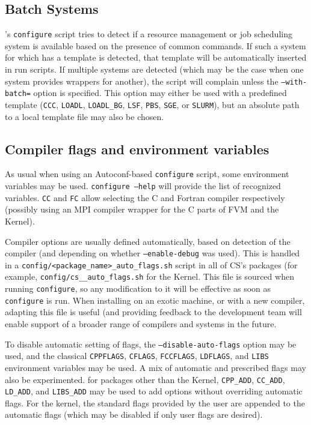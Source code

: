 \documentclass[a4paper,10pt,twoside]{article}
\begin{document}
\subsection{Batch Systems\label{sec:config:batch}}

\CS's {\tt configure} script tries to detect if a resource management or
job scheduling system is available based on the presence of common commands.
If such a system for which \CS has a template is detected,
that template will be automatically inserted in run scripts.
If multiple systems are detected (which may be the case when one system provides
wrappers for another), the script will complain unless the \texttt{--with-batch=}
option is specified. This option may either be used with a predefined template
(\texttt{CCC}, \texttt{LOADL}, \texttt{LOADL\_BG}, \texttt{LSF}, \texttt{PBS},
\texttt{SGE}, or \texttt{SLURM}), but an absolute path to a local template
file may also be chosen.

\subsection{Compiler flags and environment variables\label{sec:config:flags}}

As usual when using an Autoconf-based \texttt{configure} script,
some environment variables may be used. \texttt{configure --help}
will provide the list of recognized variables.
\texttt{CC} and \texttt{FC} allow selecting the C and Fortran compiler
respectively (possibly using an MPI compiler wrapper for the C parts
of FVM and the Kernel).

Compiler options are usually defined automatically, based on
detection of the compiler (and depending on whether \texttt{--enable-debug}
was used). This is handled in a \texttt{config/<package\_name>\_auto\_flags.sh}
script in all of CS's packages (for example,
\texttt{config/cs\_\_auto\_flags.sh}
for the Kernel. This file is sourced when running \texttt{configure}, so
any modification to it will be effective as soon as \texttt{configure} is run.
When installing on an exotic machine, or with a new compiler, adapting this
file is useful (and providing feedback to the \CS development team
will enable support of a broader range of compilers and systems in the
future.

To disable automatic setting of flags, the \texttt{--disable-auto-flags}
option may be used, and the classical \texttt{CPPFLAGS}, \texttt{CFLAGS},
\texttt{FCCFLAGS}, \texttt{LDFLAGS}, and \texttt{LIBS} environment variables
may be used. A mix of automatic and prescribed flags may also be experimented.
for packages other than the Kernel, \texttt{CPP\_ADD}, \texttt{CC\_ADD},
\texttt{LD\_ADD}, and \texttt{LIBS\_ADD} may be used to add options without
overriding automatic flags. For the kernel, the standard flags provided by
the user are appended to the automatic flags (which may be disabled
if only user flags are desired).
\end{document}
